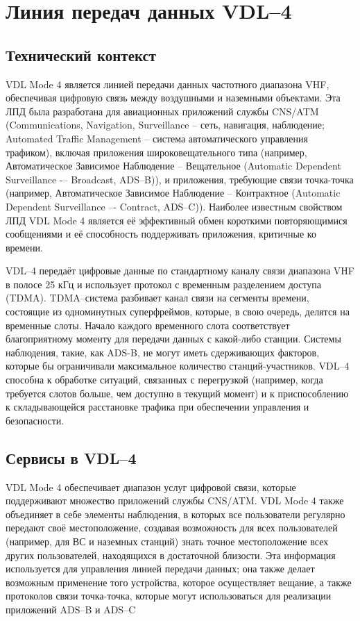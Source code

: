 \documentclass[a4paper,12pt]{report} %
\begin{document}
\section{Линия передач данных VDL--4 \cite{vdl4desc}}

\subsection{Технический контекст}

VDL Mode 4 является линией передачи данных частотного диапазона VHF, обеспечивая
цифровую связь между воздушными и наземными объектами. Эта ЛПД была разработана
для авиационных приложений службы CNS/ATM (Communications, Navigation,
Surveillance -- сеть, навигация, наблюдение; Automated Traffic Management --
система автоматического управления трафиком), включая приложения
широковещательного типа (например, Автоматическое Зависимое Наблюдение –
Вещательное (Automatic Dependent Surveillance -– Broadcast, ADS--B)), и
приложения, требующие связи точка-точка (например, Автоматическое Зависимое
Наблюдение – Контрактное (Automatic Dependent Surveillance –- Contract,
ADS--C)). Наиболее известным свойством ЛПД VDL Mode 4 является её эффективный
обмен короткими повторяющимися сообщениями и её способность поддерживать
приложения, критичные ко времени. 
 
VDL--4 передаёт цифровые данные по стандартному каналу связи диапазона VHF в
полосе 25 кГц и использует протокол с временным разделением доступа (TDMA).
TDMA--система разбивает канал связи на сегменты времени, состоящие из
одноминутных суперфреймов, которые, в свою очередь, делятся на временные слоты.
Начало каждого временного слота соответствует благоприятному моменту для
передачи данных с какой-либо станции. Системы наблюдения, такие, как ADS-B, не
могут иметь сдерживающих факторов, которые бы ограничивали максимальное
количество станций-участников. VDL--4 способна к обработке ситуаций,
связанных с перегрузкой (например, когда требуется слотов больше, чем доступно в
текущий момент) и к приспособлению к складывающейся расстановке трафика при
обеспечении управления и безопасности.

\subsection{Сервисы в VDL--4}

VDL Mode 4 обеспечивает диапазон услуг цифровой связи, которые поддерживают
множество приложений службы CNS/ATM. VDL Mode 4 также объединяет в себе элементы
наблюдения, в которых все пользователи регулярно передают своё местоположение, создавая
возможность для всех пользователей (например, для ВС и наземных станций) знать точное
местоположение всех других пользователей, находящихся в достаточной близости. Эта
информация используется для управления линией передачи данных; она также делает
возможным применение того устройства, которое осуществляет вещание, а также протоколов
связи точка-точка, которые могут использоваться для реализации приложений ADS--B и ADS--C
\end{document}
